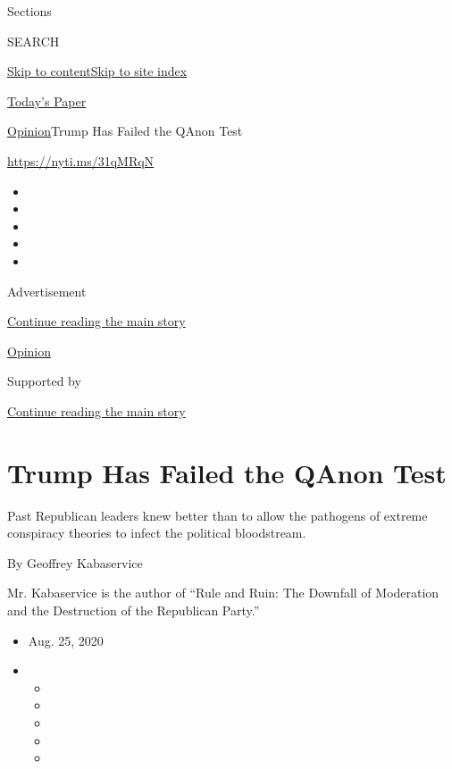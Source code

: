 Sections

SEARCH

\protect\hyperlink{site-content}{Skip to
content}\protect\hyperlink{site-index}{Skip to site index}

\href{https://myaccount.nytimes3xbfgragh.onion/auth/login?response_type=cookie\&client_id=vi}{}

\href{https://www.nytimes3xbfgragh.onion/section/todayspaper}{Today's
Paper}

\href{/section/opinion}{Opinion}\textbar{}Trump Has Failed the QAnon
Test

\url{https://nyti.ms/31qMRqN}

\begin{itemize}
\item
\item
\item
\item
\item
\end{itemize}

Advertisement

\protect\hyperlink{after-top}{Continue reading the main story}

\href{/section/opinion}{Opinion}

Supported by

\protect\hyperlink{after-sponsor}{Continue reading the main story}

\hypertarget{trump-has-failed-the-qanon-test}{%
\section{Trump Has Failed the QAnon
Test}\label{trump-has-failed-the-qanon-test}}

Past Republican leaders knew better than to allow the pathogens of
extreme conspiracy theories to infect the political bloodstream.

By Geoffrey Kabaservice

Mr. Kabaservice is the author of ``Rule and Ruin: The Downfall of
Moderation and the Destruction of the Republican Party.''

\begin{itemize}
\item
  Aug. 25, 2020
\item
  \begin{itemize}
  \item
  \item
  \item
  \item
  \item
  \end{itemize}
\end{itemize}

